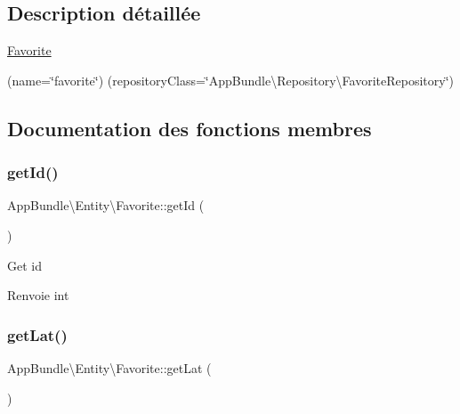 \subsection{Description détaillée}
\hyperlink{classAppBundle_1_1Entity_1_1Favorite}{Favorite}

(name=\char`\"{}favorite\char`\"{}) (repository\+Class=\char`\"{}\+App\+Bundle\textbackslash{}\+Repository\textbackslash{}\+Favorite\+Repository\char`\"{}) 

\subsection{Documentation des fonctions membres}
\mbox{\label{classAppBundle_1_1Entity_1_1Favorite_add4985c90fac741fcb1a5026bd8551e4}} 
\subsubsection{\texorpdfstring{get\+Id()}{getId()}}
{\footnotesize\ttfamily App\+Bundle\textbackslash{}\+Entity\textbackslash{}\+Favorite\+::get\+Id (\begin{DoxyParamCaption}{ }\end{DoxyParamCaption})}

Get id

\begin{DoxyReturn}{Renvoie}
int 
\end{DoxyReturn}
\mbox{\label{classAppBundle_1_1Entity_1_1Favorite_a0092e20408e1e56065c3ffc90a56acf7}} 
\subsubsection{\texorpdfstring{get\+Lat()}{getLat()}}
{\footnotesize\ttfamily App\+Bundle\textbackslash{}\+Entity\textbackslash{}\+Favorite\+::get\+Lat (\begin{DoxyParamCaption}{ }\end{DoxyParamCaption})}


